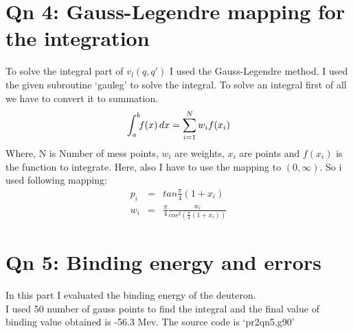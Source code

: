\documentclass[11pt,a4paper,english]{article}
\begin{document}
\section{Qn 4: Gauss-Legendre mapping for the integration }
    To solve the integral part of $v_l(q,q')$ I used the Gauss-Legendre method.
    I used the given subroutine `gauleg' to solve the integral.
    To solve an integral first of all we have to convert it to summation.\\
    \begin{equation}
    \int_{a}^{b} \!\! f(x)\,dx = \sum_{i=1}^{N} w_i f(x_i) \\
    \end{equation}
    Where, N is Number of mess points, $w_i$ are weights, $x_i$ are points and
    $f(x_i)$ is the function to integrate.
    Here, also I have to use the mapping to $(0,\infty)$. So i used 
    following mapping:\\
    \begin{eqnarray}
    p_i &=& tan\frac{\pi}{4}(1+x_i)\\
    w_i &=& \frac{\pi}{4} \frac{w_i}{cos^2(\frac{\pi}{4}(1+x_i))}
    \end{eqnarray}
    
    
\section{Qn 5: Binding energy and errors }
    In this part I evaluated the binding energy of the deuteron.\\
    I used 50 number of gauss points to find the integral and the 
    final value of binding value obtained is -56.3 Mev.
    The source code is `pr2qn5.g90'
\end{document}
